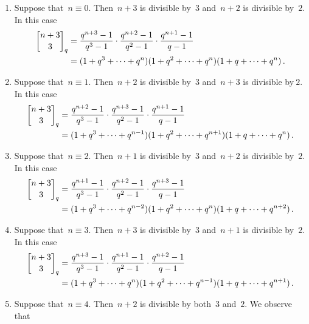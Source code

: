 \documentclass[a4paper, 11pt, twoside=semi]{scrartcl}
\begin{document}
\begin{enumerate}[label = {Case \arabic*.}]
  \item
    Suppose that~$n \equiv 0$.
    Then~$n+3$ is divisible by~$3$ and~$n+2$ is divisible by~$2$.
    In this case
    \begin{align*}
      \qbinom{n+3}{3}_q
      &=
      \frac{ q^{n+3} - 1 }{ q^3 - 1 }
      \cdot
      \frac{ q^{n+2} - 1 }{ q^2 - 1 }
      \cdot
      \frac{ q^{n+1} - 1 }{ q - 1 }
      \\
      &=
      (1 + q^3 + \dotsb + q^n) (1 + q^2 + \dotsb + q^n) (1 + q + \dotsb + q^n) \,.
    \end{align*}
  \item
    Suppose that~$n \equiv 1$.
    Then~$n+2$ is divisible by~$3$ and~$n+3$ is divisible by$~2$.
    In this case
    \begin{align*}
      \qbinom{n+3}{3}_q
      &=
      \frac{ q^{n+2} - 1 }{ q^3 - 1 }
      \cdot
      \frac{ q^{n+3} - 1 }{ q^2 - 1 }
      \cdot
      \frac{ q^{n+1} - 1 }{ q - 1 }
      \\
      &=
      (1 + q^3 + \dotsb + q^{n-1}) (1 + q^2 + \dotsb + q^{n+1}) (1 + q + \dotsb + q^n) \,.
    \end{align*}
  \item
    Suppose that~$n \equiv 2$.
    Then~$n+1$ is divisible by~$3$ and~$n+2$ is divisible by~$2$.
    In this case
    \begin{align*}
      \qbinom{n+3}{3}_q
      &=
      \frac{ q^{n+1} - 1 }{ q^3 - 1 }
      \cdot
      \frac{ q^{n+2} - 1 }{ q^2 - 1 }
      \cdot
      \frac{ q^{n+3} - 1 }{ q - 1 }
      \\
      &=
      (1 + q^3 + \dotsb + q^{n-2}) (1 + q^2 + \dotsb + q^n) (1 + q + \dotsb + q^{n+2}) \,.
    \end{align*}
  \item
    Suppose that~$n \equiv 3$.
    Then~$n+3$ is divisible by~$3$ and~$n+1$ is divisible by~$2$.
    In this case
    \begin{align*}
      \qbinom{n+3}{3}_q
      &=
      \frac{ q^{n+3} - 1 }{ q^3 - 1 }
      \cdot
      \frac{ q^{n+1} - 1 }{ q^2 - 1 }
      \cdot
      \frac{ q^{n+2} - 1 }{ q - 1 }
      \\
      &=
      (1 + q^3 + \dotsb + q^n) (1 + q^2 + \dotsb + q^{n-1}) (1 + q + \dotsb + q^{n+1}) \,.
    \end{align*}
  \item
    Suppose that~$n \equiv 4$.
    Then~$n+2$ is divisible by both~$3$ and~$2$.
    We observe that

\end{enumerate}
\end{document}
